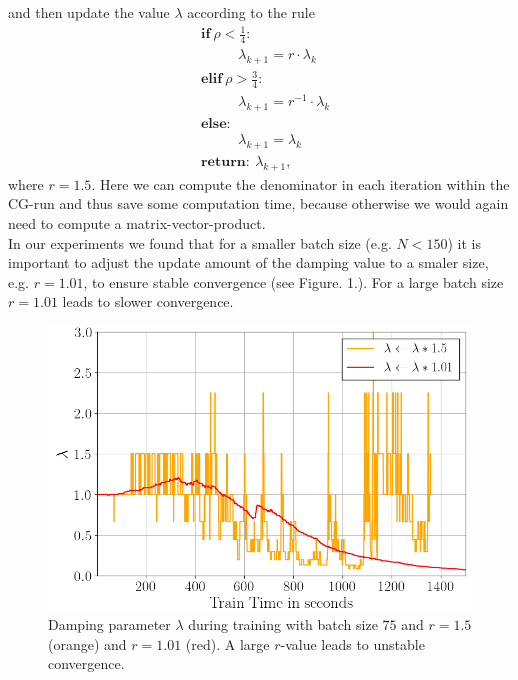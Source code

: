 \documentclass[conference]{IEEEtran}
\begin{document}
and then update the value $\lambda$ according to the rule
\begin{align}
&\textbf{if}\:\rho<\frac{1}{4}:\\
&\text{ }\text{ }\text{ }\text{ }\lambda_{k+1} = r\cdot\lambda_{k}\\
&\textbf{elif}\:\rho>\frac{3}{4}:\\
&\text{ }\text{ }\text{ }\text{ }\lambda_{k + 1} = r^{-1}\cdot\lambda_{k}\\
&\textbf{else}: \\
&\text{ }\text{ }\text{ }\text{ }\lambda_{k + 1} = \lambda_{k}\\
&\textbf{return}:\:\lambda_{k + 1},
\end{align}
where $r=1.5$. Here we can compute the denominator in each iteration within the CG-run and thus save some computation time, because otherwise we would again need to compute a matrix-vector-product.\\
In our experiments we found that for a smaller batch size (e.g. $N<150$) it is important to adjust the update amount of the damping value to a smaler size, e.g. $r=1.01$, to ensure stable convergence (see Figure. 1.). For a large batch size $r=1.01$ leads to slower convergence.

\begin{figure}[htbp]
	\centerline{\includegraphics[scale=0.52]{lambda.png}}
	\caption{Damping parameter $\lambda$ during training with batch size $75$ and $r=1.5$ (orange) and $r=1.01$ (red). A large $r$-value leads to unstable convergence.}
	\label{fig}
\end{figure}
\end{document}
